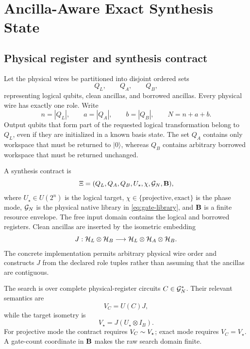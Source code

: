 \section{Ancilla-Aware Exact Synthesis State}

\subsection{Physical register and synthesis contract}

Let the physical wires be partitioned into disjoint ordered sets
\begin{equation}
Q_L,\qquad Q_A,\qquad Q_B,
\end{equation}
representing logical qubits, clean ancillas, and borrowed ancillas. Every physical wire has exactly one role. Write
\begin{equation}
n=|Q_L|,\qquad a=|Q_A|,\qquad b=|Q_B|,
\qquad N=n+a+b.
\end{equation}
Output qubits that form part of the requested logical transformation belong to $Q_L$, even if they are initialized in a known basis state. The set $Q_A$ contains only workspace that must be returned to $\lvert0\rangle$, whereas $Q_B$ contains arbitrary borrowed workspace that must be returned unchanged.

A synthesis contract is
\begin{equation}
\Xi=(Q_L,Q_A,Q_B,U_\star,\chi,\mathcal{G}_N,\mathbf{B}),
\label{eq:contract}
\end{equation}
where $U_\star\in U(2^n)$ is the logical target, $\chi\in\{\mathrm{projective},\mathrm{exact}\}$ is the phase mode, $\mathcal{G}_N$ is the physical native library in \eqref{eq:gate-library}, and $\mathbf{B}$ is a finite resource envelope. The free input domain contains the logical and borrowed registers. Clean ancillas are inserted by the isometric embedding
\begin{equation}
J:\mathcal{H}_L\otimes\mathcal{H}_B\longrightarrow
\mathcal{H}_L\otimes\mathcal{H}_A\otimes\mathcal{H}_B.
\label{eq:embedding-domain}
\end{equation}
The concrete implementation permits arbitrary physical wire order and constructs $J$ from the declared role tuples rather than assuming that the ancillas are contiguous.

The search is over complete physical-register circuits $C\in\mathcal{G}_N^\ast$. Their relevant semantics are
\begin{equation}
V_C=U(C)J,
\label{eq:candidate-isometry}
\end{equation}
while the target isometry is
\begin{equation}
V_\star=J(U_\star\otimes I_B).
\label{eq:target-isometry}
\end{equation}
For projective mode the contract requires $V_C\mathrel{\sim} V_\star$; exact mode requires $V_C=V_\star$. A gate-count coordinate in $\mathbf{B}$ makes the raw search domain finite.

